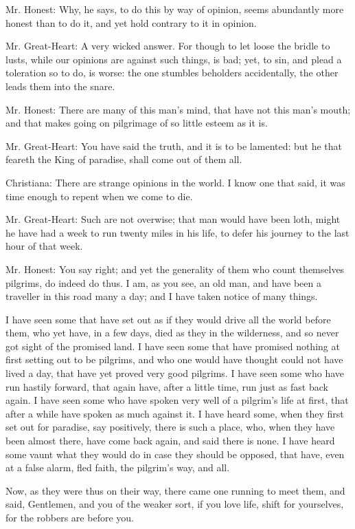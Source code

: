 Mr. Honest: Why, he says, to do this by way of opinion, seems abundantly more honest than to do it, and yet hold contrary to it in opinion.

Mr. Great-Heart: A very wicked answer. For though to let loose the bridle to lusts, while our opinions are against such things, is bad; yet, to sin, and plead a toleration so to do, is worse: the one stumbles beholders accidentally, the other leads them into the snare.

Mr. Honest: There are many of this man's mind, that have not this man's mouth; and that makes going on pilgrimage of so little esteem as it is.

Mr. Great-Heart: You have said the truth, and it is to be lamented: but he that feareth the King of paradise, shall come out of them all.

Christiana: There are strange opinions in the world. I know one that said, it was time enough to repent when we come to die.

Mr. Great-Heart: Such are not overwise; that man would have been loth, might he have had a week to run twenty miles in his life, to defer his journey to the last hour of that week.

Mr. Honest: You say right; and yet the generality of them who count themselves pilgrims, do indeed do thus. I am, as you see, an old man, and have been a traveller in this road many a day; and I have taken notice of many things.

I have seen some that have set out as if they would drive all the world before them, who yet have, in a few days, died as they in the wilderness, and so never got sight of the promised land. I have seen some that have promised nothing at first setting out to be pilgrims, and who one would have thought could not have lived a day, that have yet proved very good pilgrims. I have seen some who have run hastily forward, that again have, after a little time, run just as fast back again. I have seen some who have spoken very well of a pilgrim's life at first, that after a while have spoken as much against it. I have heard some, when they first set out for paradise, say positively, there is such a place, who, when they have been almost there, have come back again, and said there is none. I have heard some vaunt what they would do in case they should be opposed, that have, even at a false alarm, fled faith, the pilgrim's way, and all.

Now, as they were thus on their way, there came one running to meet them, and said, Gentlemen, and you of the weaker sort, if you love life, shift for yourselves, for the robbers are before you.

